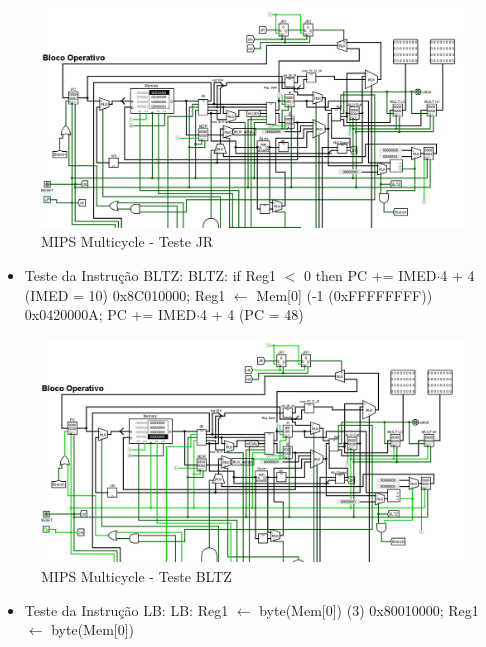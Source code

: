 \documentclass{report}
\begin{document}
        \begin{figure}[h!]
            \centering
            \includegraphics[width=\linewidth]{images/prints/Multicycle/Teste JR.png}
            \caption{\label{print:multicycle_test_JR} MIPS Multicycle - Teste JR}
        \end{figure}

        \begin{itemize}
            \item Teste da Instrução BLTZ:
                \subitem BLTZ: if Reg1 $<$ 0 then PC += IMED$\cdot$4 + 4 (IMED = 10)
                \subitem 0x8C010000; Reg1 $\leftarrow$ Mem[0] (-1 (0xFFFFFFFF))
                \subitem 0x0420000A; PC += IMED$\cdot$4 + 4 (PC = 48)
        \end{itemize}

        \begin{figure}[h!]
            \centering
            \includegraphics[width=\linewidth]{images/prints/Multicycle/Teste BLTZ.png}
            \caption{\label{print:multicycle_test_BLTZ} MIPS Multicycle - Teste BLTZ}
        \end{figure}

        \begin{itemize}
            \item Teste da Instrução LB:
                \subitem LB: Reg1 $\leftarrow$ byte(Mem[0]) (3)
                \subitem 0x80010000; Reg1 $\leftarrow$ byte(Mem[0])
        \end{itemize}
\end{document}
